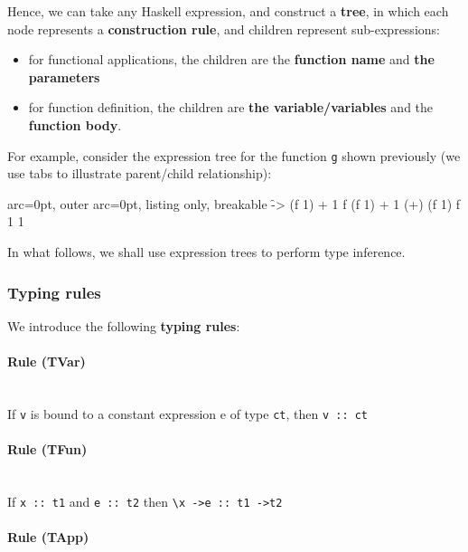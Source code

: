 Hence, we can take any Haskell expression, and construct a \textbf{tree}, in which each node represents a \textbf{construction rule}, and children represent sub-expressions:
\begin{itemize}
	\item  for functional applications, the children are the \textbf{function name} and \textbf{the parameters}
	\item  for function definition, the children are \textbf{the variable/variables} and the \textbf{function body}.
\end{itemize}

For example, consider the expression tree for the function \texttt{g} shown previously (we use tabs to illustrate parent/child relationship):

\begin{tcblisting}{ arc=0pt, outer arc=0pt, listing only, breakable}
\f -> (f 1) + 1
  f
  (f 1) + 1
    (+)
    (f 1)
       f 
       1
    1

\end{tcblisting}


In what follows, we shall use expression trees to perform type inference.

\subsubsection*{ Typing rules }

We introduce the following \textbf{typing rules}:

\paragraph{ Rule (TVar) }\hfill\\

If \texttt{v} is bound to a constant expression e of type \texttt{ct}, then \texttt{v :: ct}

\paragraph{ Rule (TFun) }\hfill\\

If \texttt{x :: t1} and \texttt{e :: t2} then \texttt{\textbackslash x -\textgreater  e  :: t1 -\textgreater  t2}

\paragraph{ Rule (TApp) }\hfill\\

